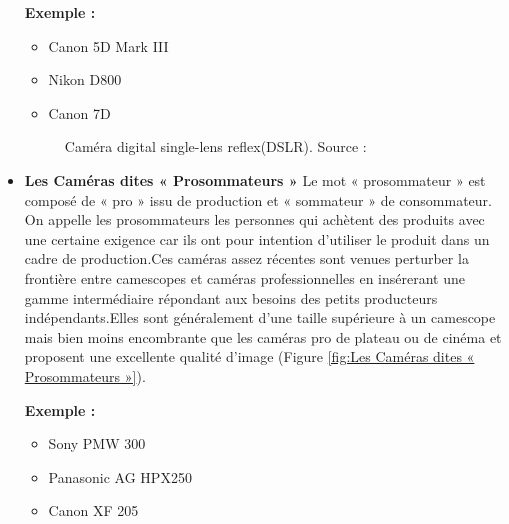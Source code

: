 \begin{itemize}
 	\textbf{Exemple :}
 	
 	\begin{itemize}
 		\item Canon 5D Mark III
 		\item Nikon D800
 		\item Canon 7D
 	\end{itemize}
 	
 	\begin{figure}[H]%
 		\center%
 		\setlength{\fboxsep}{5pt}%
 		\setlength{\fboxrule}{0.5pt}%
 	 \caption[digital single-lens reflex(DSLR)]{Caméra digital single-lens reflex(DSLR). Source :\cite{noauthor_les_2015}}
 	\label{fig:digital single-lens reflex(DSLR)}
 	\end{figure}
 	
 	\item \textbf{Les Caméras dites « Prosommateurs »} Le mot « prosommateur » est composé de « pro » issu de production et « sommateur » de consommateur. On appelle les prosommateurs les personnes qui achètent des produits avec une certaine exigence car ils ont pour intention d’utiliser le produit dans un cadre de production.Ces caméras assez récentes sont venues perturber la frontière entre camescopes et caméras professionnelles en insérerant une gamme intermédiaire répondant aux besoins des petits producteurs indépendants.Elles sont généralement d’une taille supérieure à un camescope mais bien moins encombrante que les caméras pro de plateau ou de cinéma et proposent une excellente qualité d’image (Figure \ref{fig:Les Caméras dites « Prosommateurs »}).
 	
 	\textbf{Exemple :}
 	
 	\begin{itemize}
 		\item Sony PMW 300
 		\item Panasonic AG HPX250
 		\item Canon XF 205
 	\end{itemize}
  

\end{itemize}
